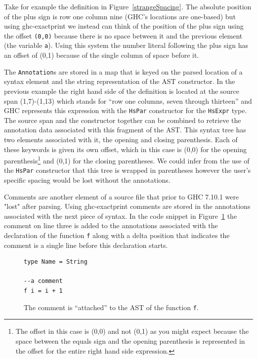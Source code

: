 Take for example the definition in Figure~\ref{strangeSpacing}. The absolute position of the plus sign is row one column nine (GHC's locations are one-based) but using ghc-exactprint we instead can think of the position of the plus sign using the offset \texttt{(0,0)} because there is no space between it and the previous element (the variable \texttt{a}). Using this system the number literal following the plus sign has an offset of (0,1) because of the single column of space before it. 

The \texttt{Annotation}s are stored in a map that is keyed on the parsed location of a syntax element and the string representation of the AST constructor. In the previous example the right hand side of the definition is located at the source span (1,7)-(1,13) which stands for ``row one columns, seven through thirteen'' and GHC represents this expression with the \texttt{HsPar} constructor for the \texttt{HsExpr} type. The source span and the constructor together can be combined to retrieve the annotation data associated with this fragment of the AST. This syntax tree has two elements associated with it, the opening and closing parenthesis. Each of these keywords is given its own offset, which in this case is (0,0) for the opening parenthesis\footnote{The offset in this case is (0,0) and not (0,1) as you might expect because the space between the equals sign and the opening parenthesis is represented in the offset for the entire right hand side expression.} and (0,1) for the closing parentheses. We could infer from the use of the \texttt{HsPar} constructor that this tree is wrapped in parentheses however the user's specific spacing would be lost without the annotations.

Comments are another element of a source file that prior to GHC 7.10.1 were "lost" after parsing. Using ghc-exactprint comments are stored in the annotations associated with the next piece of syntax. In the code snippet in Figure~\ref{commentSnippet} the comment on line three is added to the annotations associated with the declaration of the function \texttt{f} along with a delta position that indicates the comment is a single line before this declaration starts.

\begin{figure}[t]
\begin{lstlisting}
type Name = String

--a comment
f i = i + 1
\end{lstlisting}
\caption{The comment is ``attached'' to the AST of the function \texttt{f}.}
\label{commentSnippet}
\end{figure}




